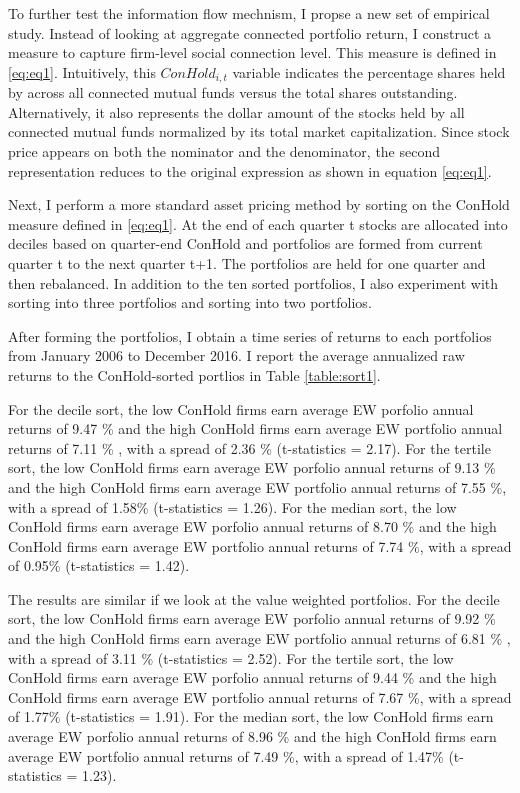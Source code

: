 \documentclass[11pt]{article}
\begin{document}
\begin{doublespace}
To further test the information flow mechnism, I propse a new set of empirical study. Instead of looking at aggregate connected portfolio return, I construct a measure to capture firm-level social connection level. This measure is defined in \ref{eq:eq1}. Intuitively, this $ConHold_{i,t}$ variable indicates the percentage shares held by across all connected mutual funds versus the total shares outstanding. Alternatively, it also represents the dollar amount of the stocks held by all connected mutual funds normalized by its total market capitalization. Since stock price appears on both the nominator and the denominator, the second representation reduces to the original expression as shown in equation \ref{eq:eq1}.

Next, I perform a more standard asset pricing method by sorting on the ConHold measure defined in \ref{eq:eq1}. At the end of each quarter t stocks are allocated into deciles based on quarter-end ConHold and 
portfolios are formed from current quarter t to the next quarter t+1. 
The portfolios are held for one quarter and then rebalanced. In addition to the ten sorted portfolios, I also experiment with sorting into three portfolios and sorting into two portfolios. 

After forming the portfolios, I obtain a time series of returns to each portfolios from January 2006 to December 2016. I report the average annualized raw returns to the ConHold-sorted portlios in Table \ref{table:sort1}. 

For the decile sort, the low ConHold firms earn average EW porfolio annual returns of 9.47 \% and the high ConHold firms earn average EW portfolio annual returns of 7.11 \% , with a spread of 2.36 \% (t-statistics = 2.17). For the tertile sort, the low ConHold firms earn average EW porfolio annual returns of 9.13 \% and the high ConHold firms earn average EW portfolio annual returns of 7.55 \%, with a spread of 1.58\% (t-statistics = 1.26). For the median sort, the low ConHold firms earn average EW porfolio annual returns of 8.70 \% and the high ConHold firms earn average EW portfolio annual returns of 7.74 \%, with a spread of 0.95\% (t-statistics = 1.42). 

The results are similar if we look at the value weighted portfolios. For the decile sort, the low ConHold firms earn average EW porfolio annual returns of 9.92 \% and the high ConHold firms earn average EW portfolio annual returns of 6.81 \% , with a spread of 3.11 \% (t-statistics = 2.52). For the tertile sort, the low ConHold firms earn average EW porfolio annual returns of 9.44 \% and the high ConHold firms earn average EW portfolio annual returns of 7.67 \%, with a spread of 1.77\% (t-statistics = 1.91). For the median sort, the low ConHold firms earn average EW porfolio annual returns of 8.96 \% and the high ConHold firms earn average EW portfolio annual returns of 7.49 \%, with a spread of 1.47\% (t-statistics = 1.23). 


\end{doublespace}
\end{document}

